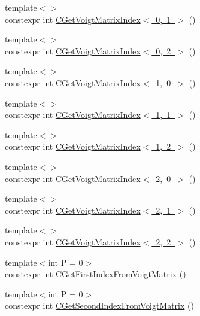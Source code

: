 \begin{DoxyCompactItemize}
\item 
{\footnotesize template$<$$>$ }\\constexpr int \mbox{\hyperlink{namespacempc_1_1utilities_a1163a24c2bd1283db7e8d0dc34bba058}{C\+Get\+Voigt\+Matrix\+Index$<$ 0, 1 $>$}} ()
\item 
{\footnotesize template$<$$>$ }\\constexpr int \mbox{\hyperlink{namespacempc_1_1utilities_a6d946e4fc6251c55592c3676a68621dd}{C\+Get\+Voigt\+Matrix\+Index$<$ 0, 2 $>$}} ()
\item 
{\footnotesize template$<$$>$ }\\constexpr int \mbox{\hyperlink{namespacempc_1_1utilities_abb39f4caf6929d77f9e58a54820e7dbb}{C\+Get\+Voigt\+Matrix\+Index$<$ 1, 0 $>$}} ()
\item 
{\footnotesize template$<$$>$ }\\constexpr int \mbox{\hyperlink{namespacempc_1_1utilities_ac1968a4d83d920187abe3b8ea87d1262}{C\+Get\+Voigt\+Matrix\+Index$<$ 1, 1 $>$}} ()
\item 
{\footnotesize template$<$$>$ }\\constexpr int \mbox{\hyperlink{namespacempc_1_1utilities_ac2da9934134d3a5867b925e1084bf1e4}{C\+Get\+Voigt\+Matrix\+Index$<$ 1, 2 $>$}} ()
\item 
{\footnotesize template$<$$>$ }\\constexpr int \mbox{\hyperlink{namespacempc_1_1utilities_a611ba0637a7bbdf72d869e716512afdb}{C\+Get\+Voigt\+Matrix\+Index$<$ 2, 0 $>$}} ()
\item 
{\footnotesize template$<$$>$ }\\constexpr int \mbox{\hyperlink{namespacempc_1_1utilities_a6c8cf9c62a6dbebe475b757cde3f50d7}{C\+Get\+Voigt\+Matrix\+Index$<$ 2, 1 $>$}} ()
\item 
{\footnotesize template$<$$>$ }\\constexpr int \mbox{\hyperlink{namespacempc_1_1utilities_a519182cb74988fa0a719633a416b07f6}{C\+Get\+Voigt\+Matrix\+Index$<$ 2, 2 $>$}} ()
\item 
{\footnotesize template$<$int P = 0$>$ }\\constexpr int \mbox{\hyperlink{namespacempc_1_1utilities_acb1091d4fd58c0821eeeba68a43146ac}{C\+Get\+First\+Index\+From\+Voigt\+Matrix}} ()
\item 
{\footnotesize template$<$int P = 0$>$ }\\constexpr int \mbox{\hyperlink{namespacempc_1_1utilities_a094a324d81b996e8397336286264dfcd}{C\+Get\+Second\+Index\+From\+Voigt\+Matrix}} ()

\end{DoxyCompactItemize}
